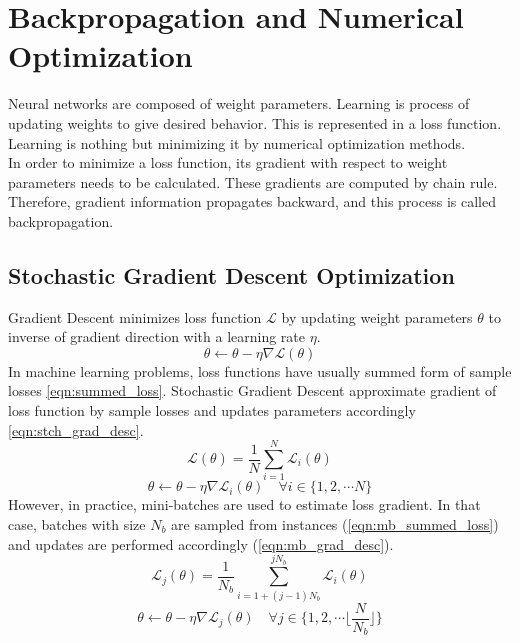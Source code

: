 \section{Backpropagation and Numerical Optimization}
Neural networks are composed of weight parameters. Learning is process of updating weights to give desired behavior. This is represented in a loss function. Learning is nothing but minimizing it by numerical optimization methods. \\
In order to minimize a loss function, its gradient with respect to weight parameters needs to be calculated. These gradients are computed by chain rule. Therefore, gradient information propagates backward, and this process is called backpropagation. \\
\subsection{Stochastic Gradient Descent Optimization}
Gradient Descent minimizes loss function $\mathcal{L}$ by updating weight parameters $\theta$ to inverse of gradient direction with a learning rate $\eta$. \\
\begin{equation}
\label{eq: grad_desc}
\theta \leftarrow \theta - \eta \nabla \mathcal{L}(\theta)
\end{equation}
In machine learning problems, loss functions have usually summed form of sample losses \eqref{eqn:summed_loss}. Stochastic Gradient Descent approximate gradient of loss function by sample losses and updates parameters accordingly \eqref{eqn:stch_grad_desc}. \\
\begin{equation}
\label{eqn:summed_loss}
\mathcal{L}(\theta) = \frac{1}{N} \sum_{i=1}^{N} \mathcal{L}_i(\theta)
\end{equation}
\begin{equation}
\label{eqn:stch_grad_desc}
\theta \leftarrow \theta - \eta \nabla \mathcal{L}_i(\theta) \quad \forall i \in \{1,2, \cdots N\}
\end{equation}
However, in practice, mini-batches are used to estimate loss gradient. In that case, batches with size $N_b$ are sampled from instances (\eqref{eqn:mb_summed_loss}) and updates are performed accordingly (\eqref{eqn:mb_grad_desc}). \\
\begin{equation}
\label{eqn:mb_summed_loss}
\mathcal{L}_j(\theta) = \frac{1}{N_b} \sum_{i=1 + (j-1) N_b}^{j N_b} \mathcal{L}_i(\theta) 
\end{equation}
\begin{equation}
\label{eqn:mb_grad_desc}
\theta \leftarrow \theta - \eta  \nabla \mathcal{L}_j(\theta) \quad \forall j \in \{1,2, \cdots \Big\lfloor\frac{N}{N_b}\Big\rfloor\}
\end{equation}
